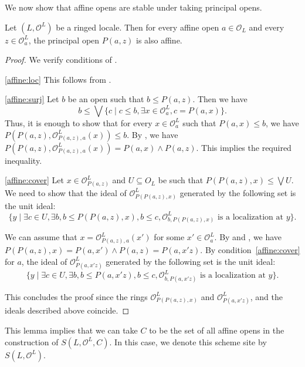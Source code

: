 \documentclass[reqno]{amsart}
\theoremstyle{definition}
\theoremstyle{remark}
\numberwithin{figure}{section}
\begin{document}
We now show that affine opens are stable under taking principal opens.

\begin{lem}[po-affine]
Let $(L,\mathcal{O}^L)$ be a ringed locale.
Then for every affine open $a \in \mathcal{O}_L$ and every $z \in \mathcal{O}^L_a$, the principal open $P(a,z)$ is also affine.
\end{lem}
\begin{proof}
We verify conditions of .

\eqref{affine:loc} This follows from .

\eqref{affine:surj} Let $b$ be an open such that $b \leq P(a,z)$. Then we have %
\[ b \leq \bigvee \{ c \mid c \leq b, \exists x \in \mathcal{O}^L_a, c = P(a,x) \}. \]
Thus, it is enough to show that for every $x \in \mathcal{O}^L_a$ such that $P(a,x) \leq b$, we have $P(P(a,z), \mathcal{O}^L_{P(a,z),a}(x)) \leq b$.
By , we have $P(P(a,z), \mathcal{O}^L_{P(a,z),a}(x)) = P(a,x) \wedge P(a,z)$.
This implies the required inequality.

\eqref{affine:cover}
Let $x \in \mathcal{O}^L_{P(a,z)}$ and $U \subseteq O_L$ be such that $P(P(a,z),x) \leq \bigvee U$.
We need to show that the ideal of $\mathcal{O}^L_{P(P(a,z),x)}$ generated by the following set is the unit ideal:
\[ \{ y \mid \exists c \in U, \exists b, b \leq P(P(a,z),x), b \leq c, \mathcal{O}^L_{b,P(P(a,z),x)} \text{ is a localization at } y \}. \]

We can assume that $x = \mathcal{O}^L_{P(a,z),a}(x')$ for some $x' \in \mathcal{O}^L_a$.
By  and , we have $P(P(a,z),x) = P(a,x') \wedge P(a,z) = P(a, x' z)$.
By condition~\eqref{affine:cover} for $a$, the ideal of $\mathcal{O}^L_{P(a, x' z)}$ generated by the following set is the unit ideal:
\[ \{ y \mid \exists c \in U, \exists b, b \leq P(a, x' z), b \leq c, \mathcal{O}^L_{b,P(a, x' z)} \text{ is a localization at } y \}. \]

This concludes the proof since the rings $\mathcal{O}^L_{P(P(a,z),x)}$ and $\mathcal{O}^L_{P(a, x' z)}$, and the ideals described above coincide.
\end{proof}

This lemma implies that we can take $C$ to be the set of all affine opens in the construction of $S(L,\mathcal{O}^L,C)$.
In this case, we denote this scheme site by $S(L,\mathcal{O}^L)$.
\end{document}
